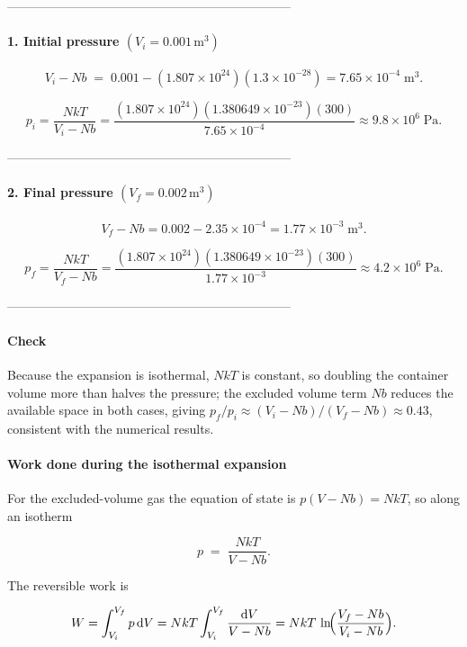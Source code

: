 \documentclass[12pt]{article}
\theoremstyle{definition} %
\theoremstyle{plain} %
\begin{document}
--------------------------------------------------------------------
\paragraph{1. Initial pressure \((V_i = 0.001\,\text{m}^{3})\)}

\[
  V_i - Nb \;=\;
  0.001 - (1.807\times10^{24})(1.3\times10^{-28})
  = 7.65\times10^{-4}\;\text{m}^{3}.
\]

\[
  p_i
  = \frac{NkT}{V_i - Nb}
  = \frac{(1.807\times10^{24})(1.380649\times10^{-23})(300)}
         {7.65\times10^{-4}}
  \approx \boxed{9.8\times10^{6}\;\text{Pa}}.
\]

--------------------------------------------------------------------
\paragraph{2. Final pressure \((V_f = 0.002\,\text{m}^{3})\)}

\[
  V_f - Nb
  = 0.002 - 2.35\times10^{-4}
  = 1.77\times10^{-3}\;\text{m}^{3}.
\]

\[
  p_f
  = \frac{NkT}{V_f - Nb}
  = \frac{(1.807\times10^{24})(1.380649\times10^{-23})(300)}
         {1.77\times10^{-3}}
  \approx \boxed{4.2\times10^{6}\;\text{Pa}}.
\]

--------------------------------------------------------------------
\paragraph{Check}  
Because the expansion is isothermal, \(NkT\) is constant, so doubling the
container volume more than halves the pressure; the excluded volume term
\(Nb\) reduces the available space in both cases, giving
\(p_f/p_i \approx (V_i-Nb)/(V_f-Nb) \approx 0.43\), consistent with the
numerical results.
\paragraph{Work done during the isothermal expansion}

For the excluded-volume gas the equation of state is  
\(p(V-Nb)=NkT\), so along an isotherm

\[
  p \;=\; \frac{NkT}{V-Nb}.
\]

The reversible work is  

\[
  W = \int_{V_i}^{V_f} p \,\dd V
      = NkT\int_{V_i}^{V_f} \frac{\dd V}{V-Nb}
      = NkT \,\ln\!\Bigl(\frac{V_f-Nb}{V_i-Nb}\Bigr).
\]
\end{document}
